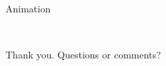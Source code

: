 \documentclass{beamer}
\begin{document}
\begin{frame}{Animation}

\begin{center}
         \\
\end{center}

\end{frame}


\begin{frame}
 \hspace{2cm} Thank you. Questions or comments?
\end{frame}
\end{document}
